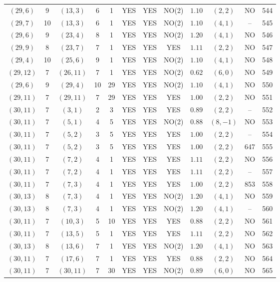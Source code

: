 \begin{longtable}{|c|c|c|c|c|c|c|c|c|c|c|c|}
$(29,6)$ & 9 & $(13,3)$ & 6 & 1 & YES & YES & NO(2) & $1.10$ & $(2,2)$ & NO & 544\\
$(29,7)$ & 10 & $(13,3)$ & 6 & 1 & YES & YES & NO(2) & $1.10$ & $(4,1)$ & -- & 545\\
$(29,6)$ & 9 & $(23,4)$ & 8 & 1 & YES & YES & NO(2) & $1.20$ & $(4,1)$ & NO & 546\\
$(29,9)$ & 8 & $(23,7)$ & 7 & 1 & YES & YES & YES & $1.11$ & $(2,2)$ & NO & 547\\
$(29,4)$ & 10 & $(25,6)$ & 9 & 1 & YES & YES & NO(2) & $1.10$ & $(4,1)$ & NO & 548\\
$(29,12)$ & 7 & $(26,11)$ & 7 & 1 & YES & YES & NO(2) & $0.62$ & $(6,0)$ & NO & 549\\
$(29,6)$ & 9 & $(29,4)$ & 10 & 29 & YES & YES & NO(2) & $1.10$ & $(4,1)$ & NO & 550\\
$(29,11)$ & 7 & $(29,11)$ & 7 & 29 & YES & YES & YES & $1.00$ & $(2,2)$ & NO & 551\\
$(30,11)$ & 7 & $(3,1)$ & 2 & 3 & YES & YES & YES & $0.89$ & $(2,2)$ & -- & 552\\
$(30,11)$ & 7 & $(5,1)$ & 4 & 5 & YES & YES & NO(2) & $0.88$ & $(8,-1)$ & NO & 553\\
$(30,11)$ & 7 & $(5,2)$ & 3 & 5 & YES & YES & YES & $1.00$ & $(2,2)$ & -- & 554\\
$(30,11)$ & 7 & $(5,2)$ & 3 & 5 & YES & YES & YES & $1.00$ & $(2,2)$ & 647 & 555\\
$(30,11)$ & 7 & $(7,2)$ & 4 & 1 & YES & YES & YES & $1.11$ & $(2,2)$ & NO & 556\\
$(30,11)$ & 7 & $(7,2)$ & 4 & 1 & YES & YES & YES & $1.11$ & $(2,2)$ & -- & 557\\
$(30,11)$ & 7 & $(7,3)$ & 4 & 1 & YES & YES & YES & $1.00$ & $(2,2)$ & 853 & 558\\
$(30,13)$ & 8 & $(7,3)$ & 4 & 1 & YES & YES & NO(2) & $1.20$ & $(4,1)$ & NO & 559\\
$(30,13)$ & 8 & $(7,3)$ & 4 & 1 & YES & YES & NO(2) & $1.20$ & $(4,1)$ & -- & 560\\
$(30,11)$ & 7 & $(10,3)$ & 5 & 10 & YES & YES & YES & $0.88$ & $(2,2)$ & NO & 561\\
$(30,11)$ & 7 & $(13,5)$ & 5 & 1 & YES & YES & YES & $1.11$ & $(2,2)$ & NO & 562\\
$(30,13)$ & 8 & $(13,6)$ & 7 & 1 & YES & YES & NO(2) & $1.20$ & $(4,1)$ & NO & 563\\
$(30,11)$ & 7 & $(17,6)$ & 7 & 1 & YES & YES & YES & $0.88$ & $(2,2)$ & NO & 564\\
$(30,11)$ & 7 & $(30,11)$ & 7 & 30 & YES & YES & NO(2) & $0.89$ & $(6,0)$ & NO & 565\\

\end{longtable}
